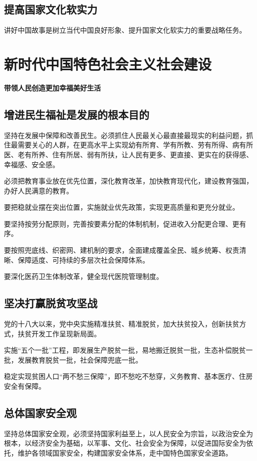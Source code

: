 \documentclass[a4paper, UTF8]{ctexart}
\begin{document}
    \subsection{提高国家文化软实力}
    讲好中国故事是树立当代中国良好形象、提升国家文化软实力的重要战略任务。

\section{新时代中国特色社会主义社会建设}
    \textbf{带领人民创造更加幸福美好生活}

    \subsection{增进民生福祉是发展的根本目的}
    坚持在发展中保障和改善民生。必须抓住人民最关心最直接最现实的利益问题，抓住最需要关心的人群，在更高水平上实现幼有所育、学有所教、劳有所得、病有所医、老有所养、住有所居、弱有所扶，让人民有更多、更直接、更实在的获得感、幸福感、安全感。

    必须把教育事业放在优先位置，深化教育改革，加快教育现代化，建设教育强国，办好人民满意的教育。

    要把稳就业摆在突出位置，实施就业优先政策，实现更高质量和更充分就业。

    要坚持按劳分配原则，完善按要素分配的体制机制，促进收入分配更合理、更有序。

    要按照兜底线、织密网、建机制的要求，全面建成覆盖全民、城乡统筹、权责清晰、保障适度、可持续的多层次社会保障体系。

    要深化医药卫生体制改革，健全现代医院管理制度。

    \subsection{坚决打赢脱贫攻坚战}
    党的十八大以来，党中央实施精准扶贫、精准脱贫，加大扶贫投入，创新扶贫方式，扶贫开发工作呈现新局面。

    实施“五个一批”工程，即发展生产脱贫一批，易地搬迁脱贫一批，生态补偿脱贫一批，发展教育脱贫一批，社会保障兜底一批。

    稳定实现贫困人口“两不愁三保障”，即不愁吃不愁穿，义务教育、基本医疗、住房安全有保障。

    \subsection{总体国家安全观}
    坚持总体国家安全观，必须坚持国家利益至上，以人民安全为宗旨，以政治安全为根本，以经济安全为基础，以军事、文化、社会安全为保障，以促进国际安全为依托，维护各领域国家安全，构建国家安全体系，走中国特色国家安全道路。
\end{document}

